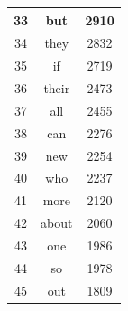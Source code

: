 \documentclass{article}
\begin{document}
\begin{table}
\begin{center}
\begin{tabular}{ c | c | c }
33 & but & 2910 \\ \hline
34 & they & 2832 \\ \hline
35 & if & 2719 \\ \hline
36 & their & 2473 \\ \hline
37 & all & 2455 \\ \hline
38 & can & 2276 \\ \hline
39 & new & 2254 \\ \hline
40 & who & 2237 \\ \hline
41 & more & 2120 \\ \hline
42 & about & 2060 \\ \hline
43 & one & 1986 \\ \hline
44 & so & 1978 \\ \hline
45 & out & 1809 \\ \hline

    \hline

  \end{tabular}
\end{center}
\end{table} ​
\end{document}
